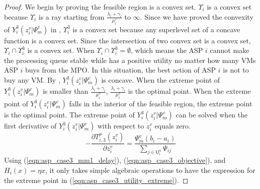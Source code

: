 \documentclass[conference]{IEEEtran}
\begin{document}
\begin{proof}
We begin by proving the feasible region is a convex set. $\Upsilon_i$ is a convex set because $\Upsilon_i$ is a ray starting from $\frac{\lambda_i+\gamma_i}{\mu_i^v}$ to $\infty$. Since we have proved the convexity of $Y_i^3(z_i^v|\Psi_m^v)$ in , $\Upsilon_i^3$ is a convex set because any superlevel set of a concave function is a convex set. Since the intersection of two convex set is a convex set, $\Upsilon_i \cap \Upsilon_i^3$ is a convex set. When $\Upsilon_i \cap \Upsilon_i^3 = \emptyset$, which means the ASP $i$ cannot make the processing queue stable while has a positive utility no matter how many VMs ASP $i$ buys from the MPO. In this situation, the best action of ASP $i$ is not to buy any VM. By , $Y_i^3(z_i^v|\Psi_m^v)$ is concave. When the extreme point of $Y_i^3(z_i^v|\Psi_m^v)$ is smaller than $\frac{\lambda_i+\gamma_i}{\mu_i^v}$, $\frac{\lambda_i+\gamma_i}{\mu_i^v}$ is the optimal point. When the extreme point of $Y_i^3(z_i^v|\Psi_m^v)$ falls in the interior of the feasible region, the extreme point is the optimal point. The extreme point of $Y_i^3(z_i^v|\Psi_m^v)$ can be solved when the first derivative of $Y_i^3(z_i^v|\Psi_m^v)$ with respect to $z_i^v$ equals zero.
\begin{equation} \label{eqn:asp_case3_utility_first_deriv}
-\frac{\partial T_{i,3}^p(z_i^v)}{\partial z_i^v} = \frac{\Psi_m^v (b_i - a_i)}{\sum_{j \in \mathsf{U}_i^n} \Psi_{ij}}
\end{equation}
Using (\ref{eqn:asp_case3_mm1_delay}), (\ref{eqn:asp_case3_objective}), and $H_i(x)=\eta x $, it only takes simple algebraic operations to have the expression for the extreme point in (\ref{eqn:asp_case3_utility_extreme}). \qedhere
\end{proof}
\end{document}
